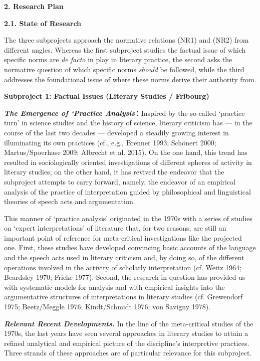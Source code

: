 \noindent\textbf{\large 2.  Research Plan}

\noindent\textbf{2.1.  State of Research}

\noindent The three subprojects approach the normative relations (NR1) and (NR2) from different angles. Whereas the first subproject studies the factual issue of which specific norms are \emph{de facto} in play in literary practice, the second asks the normative question of which specific norms \emph{should} be followed, while the third addresses the foundational issue of where these norms derive their authority from.

\vspace{.2cm}
\noindent\textbf{Subproject 1: Factual Issues (Literary Studies / Fribourg)}
\vspace{.2cm}

\noindent \textbf{\emph{The Emergence of `Practice Analysis'.}} Inspired by the so-called `practice turn' in science studies and the history of science, literary criticism has --- in the course of the last two decades --- developed a steadily growing interest in illuminating its own practices (cf., e.g., Brenner 1993; Sch\"onert 2000; Martus/Spoerhase 2009; Albrecht et al. 2015). On the one hand, this trend has resulted in sociologically oriented investigations of different spheres of activity in literary studies; on the other hand, it has revived the endeavor that the subproject attempts to carry forward, namely, the endeavor of an empirical analysis of the practice of interpretation guided by philosophical and linguistical theories of speech acts and argumentation. 

This manner of `practice analysis' originated in the 1970s with a series of studies on `expert interpretations' of literature that, for two reasons, are still an important point of reference for meta-critical investigations like the projected one. First, these studies have developed convincing basic accounts of the language and the speech acts used in literary criticism and, by doing so, of the different operations involved in the activity of scholarly interpretation (cf. Weitz 1964; Beardsley 1970; Fricke 1977). Second, the research in question has provided us with systematic models for analysis and with empirical insights into the argumentative structures of interpretations in literary studies (cf. Grewendorf 1975; Beetz/Meggle 1976; Kindt/Schmidt 1976; von Savigny 1978). 

\vspace{.2cm}
\noindent \textbf{\emph{Relevant Recent Developments.}} In the line of the meta-critical studies of the 1970s, the last years have seen several approaches in literary studies to attain a refined analytical and empirical picture of the discipline's interpretive practices. Three strands of these approaches are of particular relevance for this subproject. 

